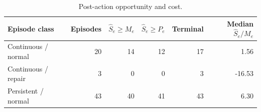 \begin{table}[!t]
\centering\small
\caption{Post-action opportunity and cost.}
\label{tab:payback}
\begin{tabular}{@{}lrrrrr@{}}\toprule
Episode class & Episodes & $\widehat S_e\geq M_e$ & $\widehat S_e\geq P_e$ & Terminal & Median $\widehat S_e/M_e$ \\
\midrule
Continuous / normal & 20 & 14 & 12 & 17 & 1.56 \\
Continuous / repair & 3 & 0 & 0 & 3 & -16.53 \\
Persistent / normal & 43 & 40 & 41 & 43 & 6.30 \\
\bottomrule\end{tabular}
\end{table}
